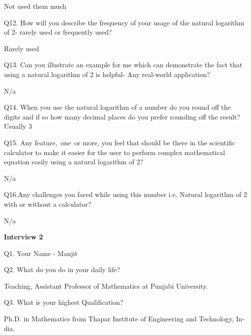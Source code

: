 \documentclass[12pt]{article}
\begin{document}
Not used them much\par


\vspace{\baselineskip}
Q12. How will you describe the frequency of your usage of the natural logarithm of 2- rarely used or frequently used?\par

Rarely used\par

Q13. Can you illustrate an example for me which can demonstrate the fact that using a natural logarithm of 2 is helpful- Any real-world application?\par

N/a\par


\vspace{\baselineskip}
Q14. When you use the natural logarithm of a number do you round off the digits and if so how many decimal places do you prefer rounding off the result? Usually 3\par


\vspace{\baselineskip}
Q15. Any feature,\  one\ or more,  you feel that should be there in the scientific calculator to make it easier for the user to perform complex mathematical equation easily using a natural logarithm of 2?\par

N/a\par


\vspace{\baselineskip}
Q16.Any challenges you faced while using this number i.e. Natural logarithm of 2 with or without a calculator?\par

N/a\par

\textbf{Interview 2}\par

Q1. Your Name - Manjit\par

Q2. What do you do in your daily life?\par

Teaching, Assistant Professor of Mathematics at Punjabi University.\par


\vspace{\baselineskip}
Q3. What is your highest Qualification?\par

Ph.D. in Mathematics from Thapar Institute of Engineering and Technology, In- dia.\par
\end{document}
